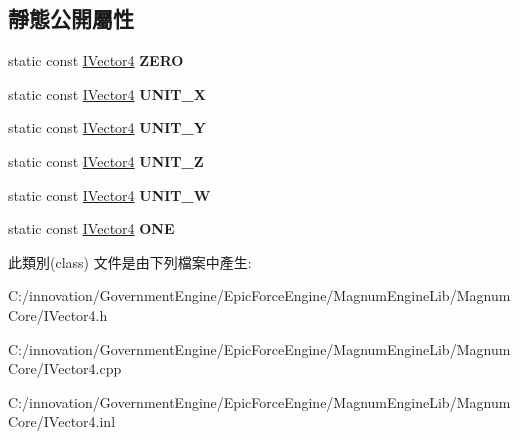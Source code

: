 \subsection*{靜態公開屬性}
\begin{DoxyCompactItemize}
\item 
static const \hyperlink{class_i_dream_sky_1_1_i_vector4}{I\+Vector4} {\bfseries Z\+E\+RO}\hypertarget{class_i_dream_sky_1_1_i_vector4_a2936d1ecb36c0525729538d756102516}{}\label{class_i_dream_sky_1_1_i_vector4_a2936d1ecb36c0525729538d756102516}

\item 
static const \hyperlink{class_i_dream_sky_1_1_i_vector4}{I\+Vector4} {\bfseries U\+N\+I\+T\+\_\+X}\hypertarget{class_i_dream_sky_1_1_i_vector4_af74fc1b74e57faa9371807c87a794de5}{}\label{class_i_dream_sky_1_1_i_vector4_af74fc1b74e57faa9371807c87a794de5}

\item 
static const \hyperlink{class_i_dream_sky_1_1_i_vector4}{I\+Vector4} {\bfseries U\+N\+I\+T\+\_\+Y}\hypertarget{class_i_dream_sky_1_1_i_vector4_a505c8e224fd962d8592dad48b8dd54f4}{}\label{class_i_dream_sky_1_1_i_vector4_a505c8e224fd962d8592dad48b8dd54f4}

\item 
static const \hyperlink{class_i_dream_sky_1_1_i_vector4}{I\+Vector4} {\bfseries U\+N\+I\+T\+\_\+Z}\hypertarget{class_i_dream_sky_1_1_i_vector4_a2497e3bde1d5c44b1f9ff941ed3e2672}{}\label{class_i_dream_sky_1_1_i_vector4_a2497e3bde1d5c44b1f9ff941ed3e2672}

\item 
static const \hyperlink{class_i_dream_sky_1_1_i_vector4}{I\+Vector4} {\bfseries U\+N\+I\+T\+\_\+W}\hypertarget{class_i_dream_sky_1_1_i_vector4_a179f1fa40a46a7a89da084be4f9977c9}{}\label{class_i_dream_sky_1_1_i_vector4_a179f1fa40a46a7a89da084be4f9977c9}

\item 
static const \hyperlink{class_i_dream_sky_1_1_i_vector4}{I\+Vector4} {\bfseries O\+NE}\hypertarget{class_i_dream_sky_1_1_i_vector4_af77d0a37bde6a29e8032c2fe19595a8e}{}\label{class_i_dream_sky_1_1_i_vector4_af77d0a37bde6a29e8032c2fe19595a8e}

\end{DoxyCompactItemize}


此類別(class) 文件是由下列檔案中產生\+:\begin{DoxyCompactItemize}
\item 
C\+:/innovation/\+Government\+Engine/\+Epic\+Force\+Engine/\+Magnum\+Engine\+Lib/\+Magnum\+Core/I\+Vector4.\+h\item 
C\+:/innovation/\+Government\+Engine/\+Epic\+Force\+Engine/\+Magnum\+Engine\+Lib/\+Magnum\+Core/I\+Vector4.\+cpp\item 
C\+:/innovation/\+Government\+Engine/\+Epic\+Force\+Engine/\+Magnum\+Engine\+Lib/\+Magnum\+Core/I\+Vector4.\+inl\end{DoxyCompactItemize}
